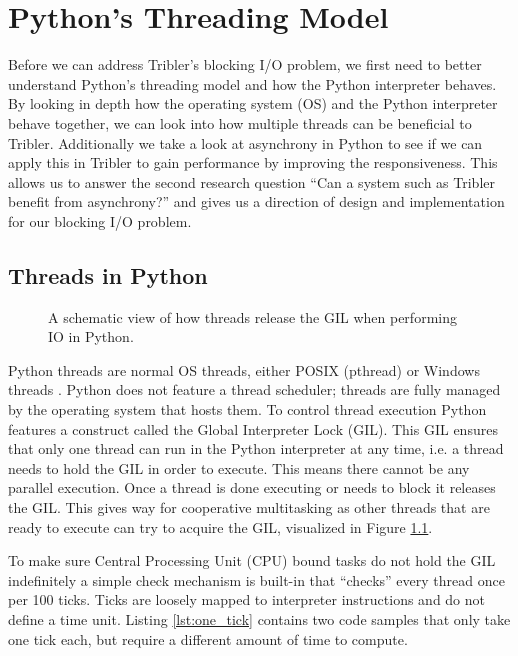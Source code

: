 \chapter{Python's Threading Model}
\label{cpt:pythons_thread_model}

Before we can address Tribler's blocking I/O problem, we first need to better understand Python's threading model and how the Python interpreter behaves.
By looking in depth how the operating system (OS) and the Python interpreter behave together, we can look into how multiple threads can be beneficial to Tribler.
Additionally we take a look at asynchrony in Python to see if we can apply this in Tribler to gain performance by improving the responsiveness.
This allows us to answer the second research question \enquote{Can a system such as Tribler benefit from asynchrony?} and gives us a direction of design and implementation for our blocking I/O problem.

\section{Threads in Python}

\begin{figure}[!h]
	\caption{A schematic view of how threads release the GIL when performing IO in Python.}
	\label{fig:python_threads_release_gil}
\end{figure}

Python threads are normal OS threads, either POSIX (pthread) or Windows threads \cite{beazley2010understanding, beazley2009inside}.
Python does not feature a thread scheduler; threads are fully managed by the operating system that hosts them.
To control thread execution Python features a construct called the Global Interpreter Lock (GIL).
This GIL ensures that only one thread can run in the Python interpreter at any time, i.e. a thread needs to hold the GIL in order to execute.
This means there cannot be any parallel execution.
Once a thread is done executing or needs to block it releases the GIL.
This gives way for cooperative multitasking as other threads that are ready to execute can try to acquire the GIL, visualized in Figure \ref{fig:python_threads_release_gil}.

To make sure Central Processing Unit (CPU) bound tasks do not hold the GIL indefinitely a simple check mechanism is built-in that \enquote{checks} every thread once per 100 ticks.
Ticks are loosely mapped to interpreter instructions and do not define a time unit.
Listing \ref{lst:one_tick} contains two code samples that only take one tick each, but require a different amount of time to compute.

